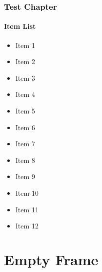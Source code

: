 \begin{frame}
	\frametitle{Test Chapter}
	\framesubtitle{Item List}

	\begin{itemize}
		\item Item 1
		\item Item 2
		\item Item 3
		\item Item 4
		\item Item 5
		\item Item 6
		\item Item 7
		\item Item 8
		\item Item 9
		\item Item 10
		\item Item 11
		\item Item 12
	\end{itemize}

\end{frame}



\section{Empty Frame}
\begin{frame}
\end{frame}



